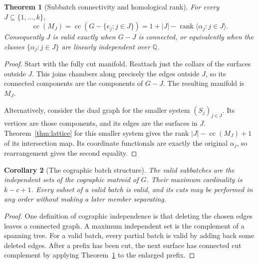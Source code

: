 \documentclass[11pt]{article}
\newtheorem{theorem}{Theorem}[section]
\newtheorem{corollary}[theorem]{Corollary}
\theoremstyle{definition}
\newcommand{\Q}{\mathbb Q}
\newcommand{\rank}{\operatorname{rank}}
\newcommand{\comp}{\operatorname{cc}}
\begin{document}
\begin{theorem}[Subbatch connectivity and homological rank]\label{thm:subbatch}
For every $J\subseteq\{1,\ldots,k\}$,
\begin{equation}\label{eq:components}
 \comp(M_J)=\comp(G-\{e_j:j\in J\})
 =1+|J|-\rank\langle\alpha_j:j\in J\rangle.
\end{equation}
Consequently $J$ is valid exactly when $G-J$ is connected, or equivalently when the classes $\{\alpha_j:j\in J\}$ are linearly independent over $\Q$.
\end{theorem}
\begin{proof}
Start with the fully cut manifold. Reattach just the collars of the surfaces outside $J$. This joins chambers along precisely the edges outside $J$, so its connected components are the components of $G-J$. The resulting manifold is $M_J$.

Alternatively, consider the dual graph for the smaller system $(S_j)_{j\in J}$. Its vertices are those components, and its edges are the surfaces in $J$. Theorem~\ref{thm:lattice} for this smaller system gives the rank $|J|-\comp(M_J)+1$ of its intersection map. Its coordinate functionals are exactly the original $\alpha_j$, so rearrangement gives the second equality.
\end{proof}

\begin{corollary}[The cographic batch structure]\label{cor:cographic}
The valid subbatches are the independent sets of the cographic matroid of $G$. Their maximum cardinality is $k-c+1$. Every subset of a valid batch is valid, and its cuts may be performed in any order without making a later member separating.
\end{corollary}
\begin{proof}
One definition of cographic independence is that deleting the chosen edges leaves a connected graph. A maximum independent set is the complement of a spanning tree. For a valid batch, every partial batch is valid by adding back some deleted edges. After a prefix has been cut, the next surface has connected cut complement by applying Theorem~\ref{thm:subbatch} to the enlarged prefix.
\end{proof}
\end{document}
